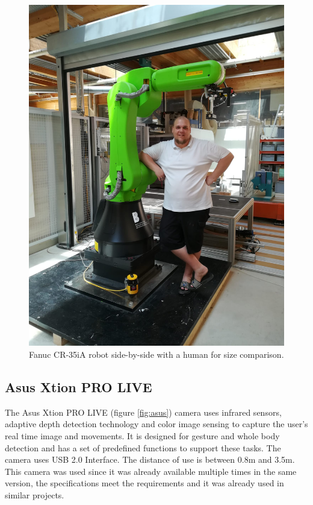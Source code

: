 \begin{figure}[H]
	\centering\includegraphics[scale=0.2]{images/robo_human.jpeg}			
	\caption{Fanuc CR-35iA robot side-by-side with a human for size comparison.}
	\label{fig:fanuc_human}
\end{figure}



\subsection{Asus Xtion PRO LIVE}
\label{subsec:asus}
The Asus Xtion PRO LIVE \cite{Asus} (figure \ref{fig:asus}) camera uses infrared sensors, adaptive depth detection technology and color image sensing to capture the user's real time image and movements. It is designed for gesture and whole body detection and has a set of predefined functions to support these tasks. The camera uses USB 2.0 Interface. The distance of use is between 0.8m and 3.5m. This camera was used since it was already available multiple times in the same version, the specifications meet the requirements and it was already used in similar projects.


